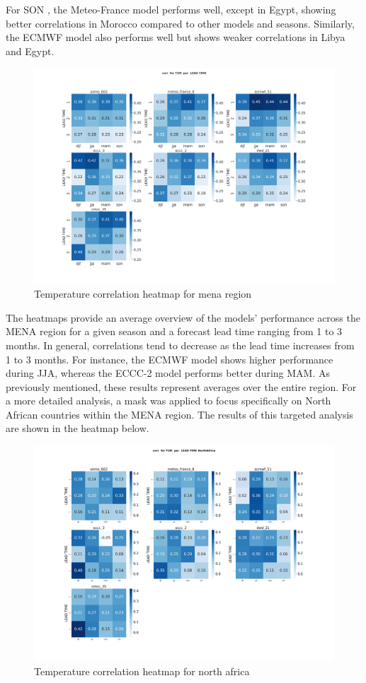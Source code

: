 For SON , the Meteo-France model performs well, except in Egypt, showing better correlations in Morocco compared to other models and seasons. Similarly, the ECMWF model also performs well but shows weaker correlations in Libya and Egypt.
\begin{figure}[H]
    \centering
    \includegraphics[width=1\linewidth]{plots/det/corr/corr_T2M.png}
    \caption{Temperature correlation heatmap for mena region}
   
\end{figure}


The heatmaps provide an average overview of the models' performance across the MENA region for a given season and a forecast lead time ranging from 1 to 3 months. In general, correlations tend to decrease as the lead time increases from 1 to 3 months. For instance, the ECMWF model shows higher performance during JJA, whereas the ECCC-2 model performs better during MAM. As previously mentioned, these results represent averages over the entire region. For a more detailed analysis, a mask was applied to focus specifically on North African countries within the MENA region. The results of this targeted analysis are shown in the heatmap below.
\begin{figure}[H]
    \centering
    \includegraphics[width=1\linewidth]{plots/det/corr/corr_T2M_NorthAfrica.png}
    \caption{Temperature correlation heatmap for north africa}
   
\end{figure}
